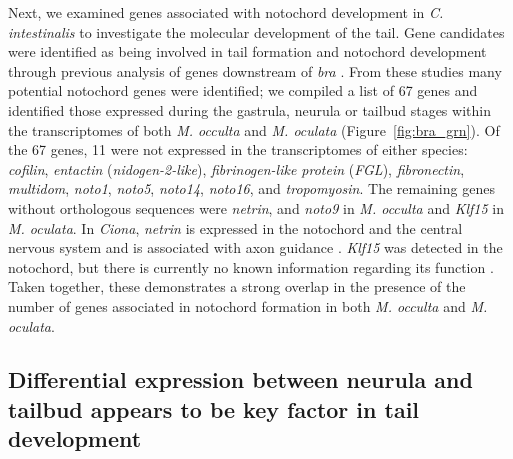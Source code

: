 Next, we examined genes associated with notochord development in \textit{C. intestinalis} to investigate the molecular development of the tail. Gene candidates were identified as being involved in tail formation and notochord development through previous analysis of genes downstream of \textit{bra} \cite{hotta_temporal_1999,hotta_characterization_2000,hotta_brachyury-downstream_2007,kugler_evolutionary_2008,kugler_evolutionary_2011}. From these studies many potential notochord genes were identified; we compiled a list of 67 genes and identified those expressed during the gastrula, neurula or tailbud stages within the %
transcriptomes of both \textit{M. occulta} and \textit{M. oculata} (Figure~\ref{fig:bra_grn}). Of the 67 genes, 11 were not expressed in the transcriptomes of either species: \textit{cofilin}, \textit{entactin} (\textit{nidogen-2-like}), \textit{fibrinogen-like protein} (\textit{FGL}), \textit{fibronectin}, \textit{multidom}, \textit{noto1}, \textit{noto5}, \textit{noto14}, \textit{noto16}, and \textit{tropomyosin}. The remaining genes without orthologous sequences were \textit{netrin}, and \textit{noto9} in \textit{M. occulta} and \textit{Klf15} in \textit{M. oculata}. In \textit{Ciona}, \textit{netrin} is expressed in the notochord and the central nervous system and is associated with axon guidance \cite{hotta_characterization_2000}. \textit{Klf15} was detected in the notochord, but there is currently no known information regarding its function \cite{passamaneck_direct_2009}. Taken together, these demonstrates a strong overlap in the presence of the number of genes associated in notochord formation in both \textit{M. occulta} and \textit{M. oculata}.

\subsection{Differential expression between neurula and tailbud appears to be key factor in tail development} 

